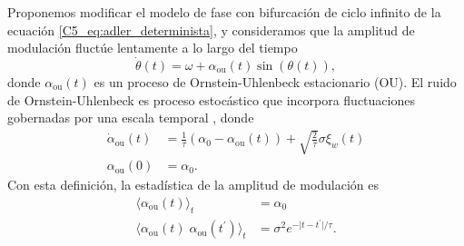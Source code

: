 \documentclass[./main.tex]{subfiles}
\begin{document}
Proponemos modificar el modelo de fase con bifurcación de ciclo infinito de la ecuación \ref{C5_eq:adler_determinista}, y consideramos que la amplitud de modulación fluctúe lentamente a lo largo del tiempo
\begin{equation}
    \dot{\theta}(t) = \omega + \alpha_{\text{ou}}(t) \sin{(\theta(t))},
    \label{C7_eq:alpha_ou}
\end{equation}
donde $\alpha_{\text{ou}}(t)$ es un proceso de Ornstein-Uhlenbeck estacionario (OU). El ruido de Ornstein-Uhlenbeck es proceso estocástico que incorpora fluctuaciones gobernadas por una escala temporal \cite{SanMiguel2000}, donde 
\begin{align}
    \dot\alpha_{\text{ou}}(t) &= \frac{1}{\tau} \left(\alpha_0 - \alpha_{\text{ou}}(t)\right) + \sqrt{\frac{2}{\tau}}\sigma \xi_w(t) \label{C7_eq:OU_langevin}\\
    \alpha_{\text{ou}}(0) &= \alpha_0.
\end{align}
Con esta definición, la estadística de la amplitud de modulación es
\begin{align}
    \langle \alpha_{\text{ou}}(t) \rangle_t &= \alpha_0 \label{C7_eq:OU_mean}\\
    \langle \alpha_{\text{ou}}(t) \; \alpha_{\text{ou}}(t^\prime) \rangle_t &= \sigma^2 e^{- \lvert t-t^\prime \rvert / \tau } \label{C7_eq:OU_corr}.
\end{align}
\end{document}
